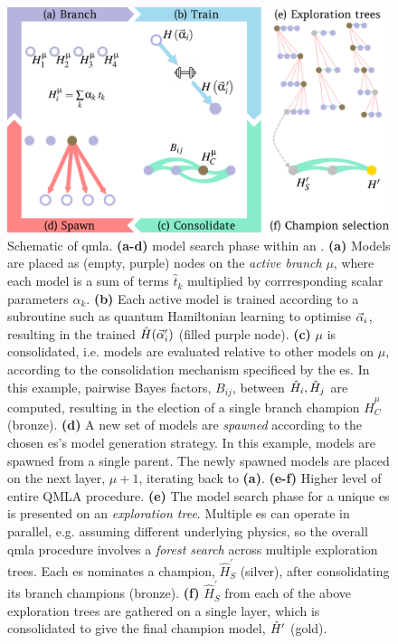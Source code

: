 \begin{figure}[t!]
    \begin{center}
        \includegraphics{algorithms/figures/overview.jpg}
    \end{center}
    \caption[Quantum Model Learning Agent overview]{
        Schematic of \acrfull{qmla}. 
        \textbf{(a-d)} \Gls{model search} phase within an .
        \textbf{(a)} Models are placed as (empty, purple) nodes on the \emph{active branch} $\mu$, 
            where each model is a sum of terms $\hat{t}_k$ multiplied by corrresponding scalar parameters $\alpha_k$. 
        \textbf{(b)} Each active model is trained according to a subroutine such as 
            quantum Hamiltonian learning to optimise $\vec{\alpha}_i$, 
            resulting in the trained $\hat{H}(\vec{\alpha}_i^{\prime})$ (filled purple node). 
        \textbf{(c)} $\mu$ is consolidated, i.e. models are evaluated relative to other
            models on $\mu$, according to the consolidation mechanism specificed by the \gls{es}.
            In this example, pairwise Bayes factors, $B_{ij}$, between $\hat{H}_i, \hat{H}_j$ are computed, 
            resulting in the election of a single branch champion $\hat{H}_C^{\mu}$ (bronze). 
        \textbf{(d)} A new set of models are \emph{spawned} according to the chosen
            \gls{es}'s model generation strategy.
            In this example, models are spawned from a single parent. 
            The newly spawned models are placed on the next layer, $\mu+1$, 
            iterating back to \textbf{(a)}.
        \textbf{(e-f)} Higher level of entire QMLA procedure.
        \textbf{(e)} The  \gls{model search}  phase for a unique \gls{es} is presented on an \emph{exploration tree}. 
            Multiple \gls{es} can operate in parallel, e.g. assuming different underlying physics, 
            so the overall \gls{qmla} procedure involves a \emph{forest search} across multiple exploration trees.
            Each \gls{es} nominates a champion, $\hat{H}_{S}^{\prime}$ (silver), 
            after consolidating its branch champions (bronze). 
        \textbf{(f)} $\hat{H}_{S}^{\prime}$ from each of the above exploration trees are gathered on a single layer, 
            which is consolidated to give the final \gls{champion model}, $\hat{H}^{\prime}$ (gold). 
    }
    \label{fig:qmla_overview}
\end{figure}

